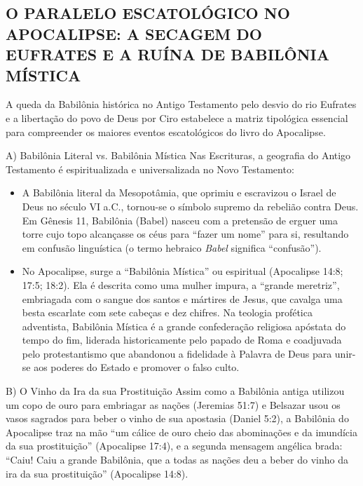 \documentclass[11pt,a4paper,openany]{book}
\begin{document}
\subsection{O PARALELO ESCATOLÓGICO NO APOCALIPSE: A SECAGEM DO EUFRATES E A RUÍNA DE BABILÔNIA MÍSTICA}


A queda da Babilônia histórica no Antigo Testamento pelo desvio do rio Eufrates e a libertação do povo de Deus por Ciro estabelece a matriz tipológica essencial para compreender os maiores eventos escatológicos do livro do Apocalipse.

A) Babilônia Literal vs. Babilônia Mística
Nas Escrituras, a geografia do Antigo Testamento é espiritualizada e universalizada no Novo Testamento:
\begin{itemize}
  \item A Babilônia literal da Mesopotâmia, que oprimiu e escravizou o Israel de Deus no século VI a.C., tornou-se o símbolo supremo da rebelião contra Deus. Em Gênesis 11, Babilônia (Babel) nasceu com a pretensão de erguer uma torre cujo topo alcançasse os céus para ``fazer um nome'' para si, resultando em confusão linguística (o termo hebraico \textit{Babel} significa ``confusão'').
  \item No Apocalipse, surge a ``Babilônia Mística'' ou espiritual (Apocalipse 14:8; 17:5; 18:2). Ela é descrita como uma mulher impura, a ``grande meretriz'', embriagada com o sangue dos santos e mártires de Jesus, que cavalga uma besta escarlate com sete cabeças e dez chifres. Na teologia profética adventista, Babilônia Mística é a grande confederação religiosa apóstata do tempo do fim, liderada historicamente pelo papado de Roma e coadjuvada pelo protestantismo que abandonou a fidelidade à Palavra de Deus para unir-se aos poderes do Estado e promover o falso culto.
\end{itemize}


B) O Vinho da Ira da sua Prostituição
Assim como a Babilônia antiga utilizou um copo de ouro para embriagar as nações (Jeremias 51:7) e Belsazar usou os vasos sagrados para beber o vinho de sua apostasia (Daniel 5:2), a Babilônia do Apocalipse traz na mão ``um cálice de ouro cheio das abominações e da imundícia da sua prostituição'' (Apocalipse 17:4), e a segunda mensagem angélica brada: ``Caiu! Caiu a grande Babilônia, que a todas as nações deu a beber do vinho da ira da sua prostituição'' (Apocalipse 14:8).
\end{document}
